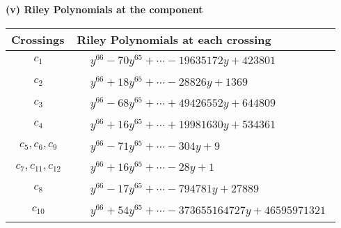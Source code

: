 \documentclass[1p]{elsarticle_modified}
\theoremstyle{definition}
\begin{document}
\newpage\renewcommand{\arraystretch}{1}
\flushleft \textbf{(v) Riley Polynomials at the component}\newline \\
\begin{tabular}{m{50pt}|m{274pt}}
Crossings & \hspace{64pt}Riley Polynomials at each crossing \\
\hline $$\begin{aligned}c_{1}\end{aligned}$$&$\begin{aligned}
&y^{66}-70 y^{65}+\cdots-19635172 y+423801
\end{aligned}$\\
\hline $$\begin{aligned}c_{2}\end{aligned}$$&$\begin{aligned}
&y^{66}+18 y^{65}+\cdots-28826 y+1369
\end{aligned}$\\
\hline $$\begin{aligned}c_{3}\end{aligned}$$&$\begin{aligned}
&y^{66}-68 y^{65}+\cdots+49426552 y+644809
\end{aligned}$\\
\hline $$\begin{aligned}c_{4}\end{aligned}$$&$\begin{aligned}
&y^{66}+16 y^{65}+\cdots+19981630 y+534361
\end{aligned}$\\
\hline $$\begin{aligned}c_{5},c_{6},c_{9}\end{aligned}$$&$\begin{aligned}
&y^{66}-71 y^{65}+\cdots-304 y+9
\end{aligned}$\\
\hline $$\begin{aligned}c_{7},c_{11},c_{12}\end{aligned}$$&$\begin{aligned}
&y^{66}+16 y^{65}+\cdots-28 y+1
\end{aligned}$\\
\hline $$\begin{aligned}c_{8}\end{aligned}$$&$\begin{aligned}
&y^{66}-17 y^{65}+\cdots-794781 y+27889
\end{aligned}$\\
\hline $$\begin{aligned}c_{10}\end{aligned}$$&$\begin{aligned}
&y^{66}+54 y^{65}+\cdots-373655164727 y+46595971321
\end{aligned}$\\
\hline
\end{tabular}\\~\\
\end{document}
